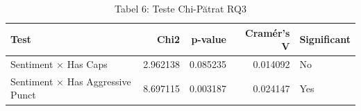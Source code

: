 \begin{table}
\caption{Tabel 6: Teste Chi-Pătrat RQ3}
\label{tab:tabel_6:_teste_chi-pătrat_rq3}
\begin{tabular}{lrrrl}
\toprule
Test & Chi2 & p-value & Cramér's V & Significant \\
\midrule
Sentiment × Has Caps & 2.962138 & 0.085235 & 0.014092 & No \\
Sentiment × Has Aggressive Punct & 8.697115 & 0.003187 & 0.024147 & Yes \\
\bottomrule
\end{tabular}
\end{table}


